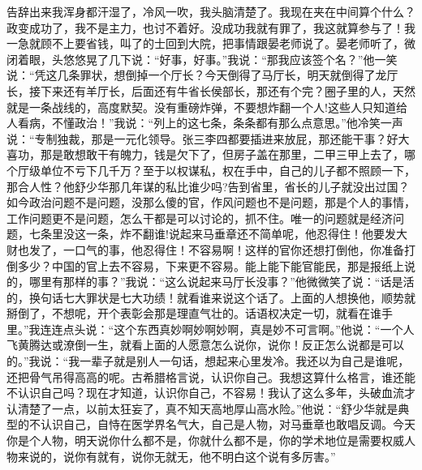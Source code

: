 \documentclass[12pt,oneside]{book}
\begin{document}
告辞出来我浑身都汗湿了，冷风一吹，我头脑清楚了。我现在夹在中间算个什么？政变成功了，我不是主力，也讨不着好。没成功我就有罪了，我这就算参与了！我一急就顾不上要省钱，叫了的士回到大院，把事情跟晏老师说了。晏老师听了，微闭着眼，头悠悠晃了几下说：``好事，好事。''我说：``那我应该签个名？''他一笑说：``凭这几条罪状，想倒掉一个厅长？今天倒得了马厅长，明天就倒得了龙厅长，接下来还有羊厅长，后面还有牛省长侯部长，那还有个完？圈子里的人，天然就是一条战线的，高度默契。没有重磅炸弹，不要想炸翻一个人!这些人只知道给人看病，不懂政治！''我说：``列上的这七条，条条都有那么点意思。''他冷笑一声说：``专制独裁，那是一元化领导。张三李四都要插进来放屁，那还能干事？好大喜功，那是敢想敢干有魄力，钱是欠下了，但房子盖在那里，二甲三甲上去了，哪个厅级单位不亏下几千万？至于以权谋私，权在手中，自己的儿子都不照顾一下，那合人性？他舒少华那几年谋的私比谁少吗?告到省里，省长的儿子就没出过国？如今政治问题不是问题，没那么傻的官，作风问题也不是问题，那是个人的事情，工作问题更不是问题，怎么干都是可以讨论的，抓不住。唯一的问题就是经济问题，七条里没这一条，炸不翻谁!说起来马垂章还不简单呢，他忍得住！他要发大财也发了，一口气的事，他忍得住！不容易啊！这样的官你还想打倒他，你准备打倒多少？中国的官上去不容易，下来更不容易。能上能下能官能民，那是报纸上说的，哪里有那样的事？''我说：``这么说起来马厅长没事？''他微微笑了说：``话是活的，换句话七大罪状是七大功绩！就看谁来说这个话了。上面的人想换他，顺势就掰倒了，不想呢，开个表彰会那是理直气壮的。话语权决定一切，就看在谁手里。''我连连点头说：``这个东西真妙啊妙啊妙啊，真是妙不可言啊。''他说：``一个人飞黄腾达或潦倒一生，就看上面的人愿意怎么说你，说你！反正怎么说都是可以的。''我说：``我一辈子就是别人一句话，想起来心里发冷。我还以为自己是谁呢，还把骨气吊得高高的呢。古希腊格言说，认识你自己。我想这算什么格言，谁还能不认识自己吗？现在才知道，认识你自己，不容易！我认了这么多年，头破血流才认清楚了一点，以前太狂妄了，真不知天高地厚山高水险。''他说：``舒少华就是典型的不认识自己，自恃在医学界名气大，自己是人物，对马垂章也敢唱反调。今天你是个人物，明天说你什么都不是，你就什么都不是，你的学术地位是需要权威人物来说的，说你有就有，说你无就无，他不明白这个说有多厉害。''
\end{document}
